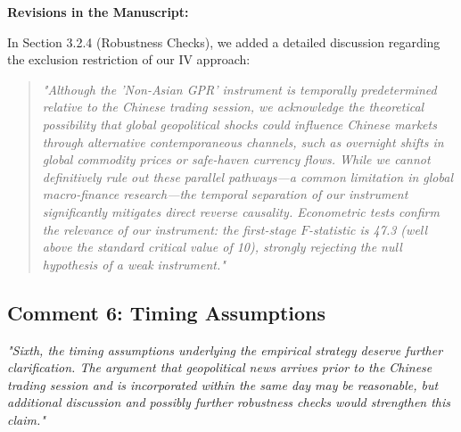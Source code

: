 \documentclass[12pt]{article}
\begin{document}
\begin{highlightbox}
\textbf{Revisions in the Manuscript:}

In Section 3.2.4 (Robustness Checks), we added a detailed discussion regarding the exclusion restriction of our IV approach:
\vspace{0.2cm}
\begin{quote}
\color{red}\itshape "Although the 'Non-Asian GPR' instrument is temporally predetermined relative to the Chinese trading session, we acknowledge the theoretical possibility that global geopolitical shocks could influence Chinese markets through alternative contemporaneous channels, such as overnight shifts in global commodity prices or safe-haven currency flows. While we cannot definitively rule out these parallel pathways—a common limitation in global macro-finance research—the temporal separation of our instrument significantly mitigates direct reverse causality. Econometric tests confirm the relevance of our instrument: the first-stage $F$-statistic is 47.3 (well above the standard critical value of 10), strongly rejecting the null hypothesis of a weak instrument."
\end{quote}
\end{highlightbox}

\subsection*{Comment 6: Timing Assumptions}
\textit{"Sixth, the timing assumptions underlying the empirical strategy deserve further clarification. The argument that geopolitical news arrives prior to the Chinese trading session and is incorporated within the same day may be reasonable, but additional discussion and possibly further robustness checks would strengthen this claim."}
\end{document}

